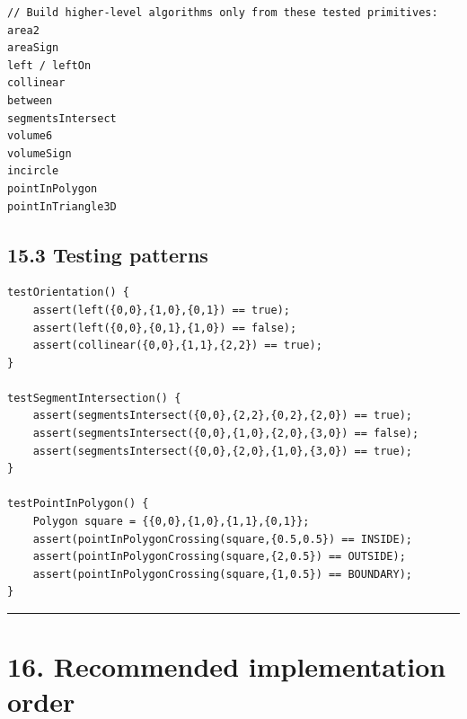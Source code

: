 \documentclass[11pt]{article}
\begin{document}
\begin{verbatim}
// Build higher-level algorithms only from these tested primitives:
area2
areaSign
left / leftOn
collinear
between
segmentsIntersect
volume6
volumeSign
incircle
pointInPolygon
pointInTriangle3D
\end{verbatim}

\subsection{15.3 Testing patterns}\label{testing-patterns}

\begin{verbatim}
testOrientation() {
    assert(left({0,0},{1,0},{0,1}) == true);
    assert(left({0,0},{0,1},{1,0}) == false);
    assert(collinear({0,0},{1,1},{2,2}) == true);
}

testSegmentIntersection() {
    assert(segmentsIntersect({0,0},{2,2},{0,2},{2,0}) == true);
    assert(segmentsIntersect({0,0},{1,0},{2,0},{3,0}) == false);
    assert(segmentsIntersect({0,0},{2,0},{1,0},{3,0}) == true);
}

testPointInPolygon() {
    Polygon square = {{0,0},{1,0},{1,1},{0,1}};
    assert(pointInPolygonCrossing(square,{0.5,0.5}) == INSIDE);
    assert(pointInPolygonCrossing(square,{2,0.5}) == OUTSIDE);
    assert(pointInPolygonCrossing(square,{1,0.5}) == BOUNDARY);
}
\end{verbatim}

\begin{center}\rule{0.5\linewidth}{0.5pt}\end{center}

\section{16. Recommended implementation
order}\label{recommended-implementation-order}
\end{document}
